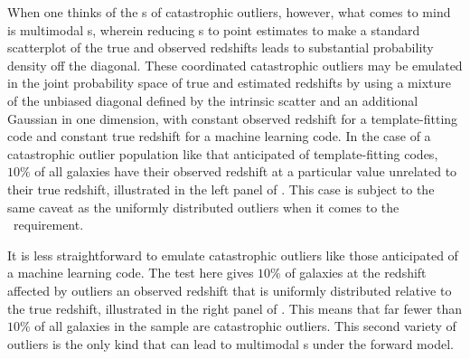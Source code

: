 When one thinks of the \pzpdf s of catastrophic outliers, however, what comes to mind is multimodal \pzpdf s, wherein reducing \pzpdf s to point estimates to make a standard scatterplot of the true and observed redshifts leads to substantial probability density off the diagonal.
These coordinated catastrophic outliers may be emulated in the joint probability space of true and estimated redshifts by using a mixture of the unbiased diagonal defined by the intrinsic scatter and an additional Gaussian in one dimension, with constant observed redshift for a template-fitting code and constant true redshift for a machine learning code.
In the case of a catastrophic outlier population like that anticipated of template-fitting codes, $10\%$ of all galaxies have their observed redshift at a particular value unrelated to their true redshift, illustrated in the left panel of .
This case is subject to the same caveat as the uniformly distributed outliers when it comes to the \lsst\ requirement.

It is less straightforward to emulate catastrophic outliers like those anticipated of a machine learning code.
The test here gives $10\%$ of galaxies at the redshift affected by outliers an observed redshift that is uniformly distributed relative to the true redshift, illustrated in the right panel of .
This means that far fewer than $10\%$ of all galaxies in the sample are catastrophic outliers.
This second variety of outliers is the only kind that can lead to multimodal \pzpdf s under the forward model.

